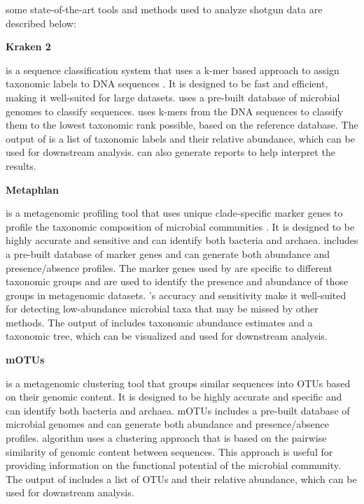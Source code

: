             some state-of-the-art tools and methods used to analyze shotgun data are described below:
            
            \textbf{Kraken 2}
            
             is a sequence classification system that uses a k-mer based approach to assign taxonomic labels to DNA sequences \cite{wood2019improved}. It is designed to be fast and efficient, making it well-suited for large datasets.  uses a pre-built database of microbial genomes to classify sequences.  uses k-mers from the DNA sequences to classify them to the lowest taxonomic rank possible, based on the reference database. The output of  is a list of taxonomic labels and their relative abundance, which can be used for downstream analysis.  can also generate reports to help interpret the results.
            
            \textbf{Metaphlan}
            
             is a metagenomic profiling tool that uses unique clade-specific marker genes to profile the taxonomic composition of microbial communities \cite{blanco2023extending}. It is designed to be highly accurate and sensitive and can identify both bacteria and archaea.  includes a pre-built database of marker genes and can generate both abundance and presence/absence profiles. The marker genes used by  are specific to different taxonomic groups and are used to identify the presence and abundance of those groups in metagenomic datasets.  's accuracy and sensitivity make it well-suited for detecting low-abundance microbial taxa that may be missed by other methods. The output of  includes taxonomic abundance estimates and a taxonomic tree, which can be visualized and used for downstream analysis.
            
            \textbf{mOTUs}
            
             is a metagenomic clustering tool that groups similar sequences into OTUs based on their genomic content\cite{milanese2019microbial}. It is designed to be highly accurate and specific and can identify both bacteria and archaea. mOTUs includes a pre-built database of microbial genomes and can generate both abundance and presence/absence profiles.  algorithm uses a clustering approach that is based on the pairwise similarity of genomic content between sequences. This approach is useful for providing information on the functional potential of the microbial community. The output of  includes a list of OTUs and their relative abundance, which can be used for downstream analysis.
    
